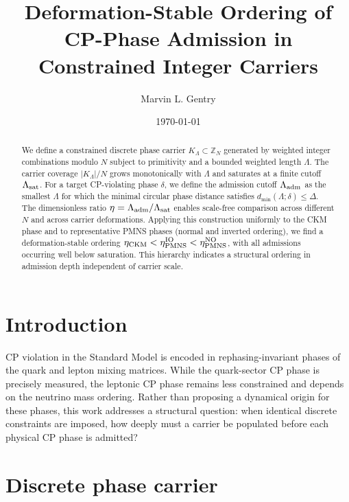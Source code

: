 \documentclass[aps,prd,twocolumn,nofootinbib,superscriptaddress]{revtex4-2}
\begin{document}
\title{Deformation-Stable Ordering of CP-Phase Admission in Constrained Integer Carriers}

\author{Marvin L. Gentry}

\date{\today}

\begin{abstract}
We define a constrained discrete phase carrier $K_\Lambda\subset\mathbb{Z}_N$ generated by weighted integer combinations modulo $N$ subject to primitivity and a bounded weighted length $\Lambda$. The carrier coverage $|K_\Lambda|/N$ grows monotonically with $\Lambda$ and saturates at a finite cutoff $\Lambda_{\rm sat}$. For a target CP-violating phase $\delta$, we define the admission cutoff $\Lambda_{\rm adm}$ as the smallest $\Lambda$ for which the minimal circular phase distance satisfies $d_{\min}(\Lambda;\delta)\le \Delta$. The dimensionless ratio $\eta=\Lambda_{\rm adm}/\Lambda_{\rm sat}$ enables scale-free comparison across different $N$ and across carrier deformations. Applying this construction uniformly to the CKM phase and to representative PMNS phases (normal and inverted ordering), we find a deformation-stable ordering
$\eta_{\rm CKM}<\eta_{\rm PMNS}^{\rm IO}<\eta_{\rm PMNS}^{\rm NO}$,
with all admissions occurring well below saturation. This hierarchy indicates a structural ordering in admission depth independent of carrier scale.
\end{abstract}

\maketitle

\section{Introduction}

CP violation in the Standard Model is encoded in rephasing-invariant phases of the quark and lepton mixing matrices. While the quark-sector CP phase is precisely measured, the leptonic CP phase remains less constrained and depends on the neutrino mass ordering. Rather than proposing a dynamical origin for these phases, this work addresses a structural question: when identical discrete constraints are imposed, how deeply must a carrier be populated before each physical CP phase is admitted?

\section{Discrete phase carrier}
\end{document}
